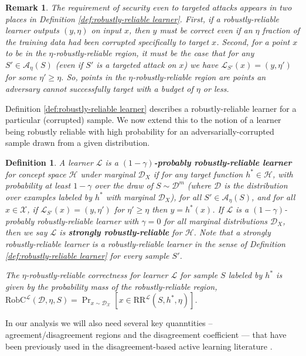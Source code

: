 \documentclass[11pt]{article}
\newcommand{\CR}{\text{RR}}
\newtheorem{remark}{Remark}
\newtheorem{definition}{Definition}
\newcommand{\0}{\mathbf{0}}
\newcommand{\1}{\mathbf{1}}
\newcommand{\cA}{\mathcal{A}}
\newcommand{\cD}{\mathcal{D}}
\newcommand{\cH}{\mathcal{H}}
\newcommand{\cL}{\mathcal{L}}
\newcommand{\cX}{\mathcal{X}}
\begin{document}
\begin{remark}
The requirement of security even to targeted attacks appears in two places in Definition \ref{def:robustly-reliable learner}.  First, if a robustly-reliable learner outputs $(y,\eta)$ on input $x$, then $y$ must be correct even if an $\eta$ fraction of the training data had been corrupted specifically to target $x$.  Second, for a point $x$ to be in the $\eta$-robustly-reliable region, it must be the case that for any $S'\in\cA_\eta(S)$ (even if $S'$ is a targeted attack on $x$) we have $\cL_{S'}(x)=(y,\eta')$ for some $\eta'\ge\eta$.  So, points in the $\eta$-robustly-reliable region are points an adversary cannot successfully target with a budget of $\eta$ or less.
\end{remark}


Definition \ref{def:robustly-reliable learner} describes a robustly-reliable learner for a particular (corrupted) sample. We now extend this to the notion of a learner being robustly reliable with high probability for an adversarially-corrupted sample drawn from a given distribution.

\begin{definition}
A learner $\cL$ is a {\bf $(1-\gamma)$-probably robustly-reliable learner} for concept space $\cH$
under marginal $\cD_X$
if for any target function $h^*\in\cH$,
with probability at least $1-\gamma$ over the draw of $S\sim\cD^m$ (where $\cD$ is the distribution over examples labeled by $h^*$ with marginal $\cD_X$), for all $S'\in\cA_\eta(S)$, and for all $x\in\cX$, if $\cL_{S'}(x)=(y,\eta')$ for $\eta'\geq \eta$ then $y= h^*(x)$.
If $\cL$ is a $(1-\gamma)$-probably robustly-reliable learner with $\gamma=0$ for all marginal distributions $\cD_X$, then we say
$\cL$ is {\bf strongly robustly-reliable} for $\cH$.
Note that
a strongly robustly-reliable learner is a robustly-reliable learner in the sense of Definition \ref{def:robustly-reliable learner} for every sample $S'$.

The $\eta$-robustly-reliable correctness for learner $\cL$ for sample $S$ labeled by $h^*$ is given by the probability mass of the robustly-reliable region, $\text{RobC}^\cL(\cD,\eta,S)=\Pr_{x\sim\cD_\cX}[x\in\CR^\cL(S,h^*,\eta)]$.




\label{def:probably robustly-reliable learner}
\end{definition}





In our analysis we will also need several key quanntities -- agreement/disagreement regions and the disagreement coefficient ---  that have been previously used in the disagreement-based active learning literature \citep{balcan2006agnostic,hanneke2007bound,balcan2009agnostic}.
\end{document}
